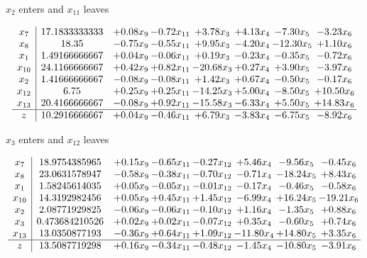 \documentclass[8pt]{article}
\begin{document}
 $ x_{2} $ enters and $ x_{11} $ leaves 

 \[\begin{array}{c| c c@{\hskip 2pt} c@{\hskip 2pt} c@{\hskip 2pt} c@{\hskip 2pt} c@{\hskip 2pt} c@{\hskip 2pt} }
 x_{7}   &  17.1833333333 & +  0.08 x_{9} & -0.72 x_{11} & +  3.78 x_{3} & +  4.13 x_{4} & -7.30 x_{5} & -3.23 x_{6}\\
 x_{8}   &  18.35 & -0.75 x_{9} & -0.55 x_{11} & +  9.95 x_{3} & -4.20 x_{4} & -12.30 x_{5} & +  1.10 x_{6}\\
 x_{1}   &  1.49166666667 & +  0.04 x_{9} & -0.06 x_{11} & +  0.19 x_{3} & -0.23 x_{4} & -0.35 x_{5} & -0.72 x_{6}\\
 x_{10}   &  24.1166666667 & +  0.42 x_{9} & +  0.82 x_{11} & -20.68 x_{3} & +  0.27 x_{4} & +  3.90 x_{5} & -3.97 x_{6}\\
 x_{2}   &  1.41666666667 & -0.08 x_{9} & -0.08 x_{11} & +  1.42 x_{3} & +  0.67 x_{4} & -0.50 x_{5} & -0.17 x_{6}\\
 x_{12}   &  6.75 & +  0.25 x_{9} & +  0.25 x_{11} & -14.25 x_{3} & +  5.00 x_{4} & -8.50 x_{5} & + 10.50 x_{6}\\
 x_{13}   &  20.4166666667 & -0.08 x_{9} & +  0.92 x_{11} & -15.58 x_{3} & -6.33 x_{4} & +  5.50 x_{5} & + 14.83 x_{6}\\
\hline
z    &  10.2916666667 & +  0.04 x_{9} & -0.46 x_{11} & +  6.79 x_{3} & -3.83 x_{4} & -6.75 x_{5} & -8.92 x_{6}\\
\end{array}\]


 $ x_{3} $ enters and $ x_{12} $ leaves 

 \[\begin{array}{c| c c@{\hskip 2pt} c@{\hskip 2pt} c@{\hskip 2pt} c@{\hskip 2pt} c@{\hskip 2pt} c@{\hskip 2pt} }
 x_{7}   &  18.9754385965 & +  0.15 x_{9} & -0.65 x_{11} & -0.27 x_{12} & +  5.46 x_{4} & -9.56 x_{5} & -0.45 x_{6}\\
 x_{8}   &  23.0631578947 & -0.58 x_{9} & -0.38 x_{11} & -0.70 x_{12} & -0.71 x_{4} & -18.24 x_{5} & +  8.43 x_{6}\\
 x_{1}   &  1.58245614035 & +  0.05 x_{9} & -0.05 x_{11} & -0.01 x_{12} & -0.17 x_{4} & -0.46 x_{5} & -0.58 x_{6}\\
 x_{10}   &  14.3192982456 & +  0.05 x_{9} & +  0.45 x_{11} & +  1.45 x_{12} & -6.99 x_{4} & + 16.24 x_{5} & -19.21 x_{6}\\
 x_{2}   &  2.08771929825 & -0.06 x_{9} & -0.06 x_{11} & -0.10 x_{12} & +  1.16 x_{4} & -1.35 x_{5} & +  0.88 x_{6}\\
 x_{3}   &  0.473684210526 & +  0.02 x_{9} & +  0.02 x_{11} & -0.07 x_{12} & +  0.35 x_{4} & -0.60 x_{5} & +  0.74 x_{6}\\
 x_{13}   &  13.0350877193 & -0.36 x_{9} & +  0.64 x_{11} & +  1.09 x_{12} & -11.80 x_{4} & + 14.80 x_{5} & +  3.35 x_{6}\\
\hline
z    &  13.5087719298 & +  0.16 x_{9} & -0.34 x_{11} & -0.48 x_{12} & -1.45 x_{4} & -10.80 x_{5} & -3.91 x_{6}\\
\end{array}\]
\end{document}

